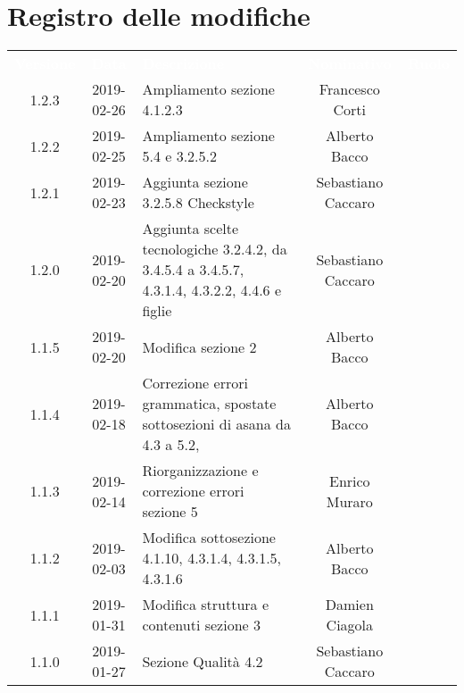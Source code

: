 
\section*{Registro delle modifiche}
{
	\renewcommand{\arraystretch}{1.5}
	\centering
	\begin{longtable}{ c c C{4cm}  c  c }
		
		\textcolor{white}{\textbf{Versione}} & \textcolor{white}{\textbf{Data}} & \textcolor{white}{\textbf{Descrizione}} & \textcolor{white}{\textbf{Nominativo}} & \textcolor{white}{\textbf{Ruolo}}\\
		
		1.2.3 & 2019-02-26 & Ampliamento sezione 4.1.2.3 & Francesco Corti & \reda{} \\	
		
		1.2.2 & 2019-02-25 & Ampliamento sezione 5.4 e 3.2.5.2 & Alberto Bacco & \reda{} \\
		
		1.2.1 & 2019-02-23 & Aggiunta sezione 3.2.5.8 Checkstyle & Sebastiano Caccaro & \reda{} \\		
		
		1.2.0 & 2019-02-20 & Aggiunta scelte tecnologiche 3.2.4.2, da 3.4.5.4 a 3.4.5.7, 4.3.1.4, 4.3.2.2, 4.4.6 e figlie & Sebastiano Caccaro & \reda{} \\	
		
		1.1.5 & 2019-02-20 & Modifica sezione 2 & Alberto Bacco & \reda{} \\
		
		1.1.4 & 2019-02-18 & Correzione errori grammatica, spostate sottosezioni di asana da 4.3 a 5.2, & Alberto Bacco & \reda{} \\
		
		1.1.3 & 2019-02-14 & Riorganizzazione e correzione errori sezione 5 & Enrico Muraro & \reda{} \\
		
		1.1.2 & 2019-02-03 & Modifica sottosezione 4.1.10, 4.3.1.4, 4.3.1.5, 4.3.1.6 & Alberto Bacco& \reda{} \\	
		
		1.1.1 & 2019-01-31 & Modifica struttura e contenuti sezione 3  & Damien Ciagola & \reda{} \\	
		
		1.1.0 & 2019-01-27 & Sezione Qualità 4.2 & Sebastiano Caccaro & \reda{} \\	
		

\end{longtable}}
